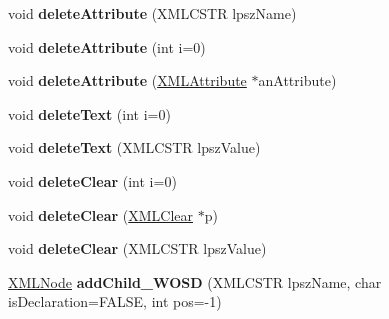 \begin{DoxyCompactItemize}
\item 
void {\bfseries delete\+Attribute} (X\+M\+L\+C\+S\+TR lpsz\+Name)\hypertarget{struct_x_m_l_node_a2b21339e5b370f1d7ebde2dc51217eed}{}\label{struct_x_m_l_node_a2b21339e5b370f1d7ebde2dc51217eed}

\item 
void {\bfseries delete\+Attribute} (int i=0)\hypertarget{struct_x_m_l_node_a61b2405305063594b35b309cc2e22c01}{}\label{struct_x_m_l_node_a61b2405305063594b35b309cc2e22c01}

\item 
void {\bfseries delete\+Attribute} (\hyperlink{struct_x_m_l_attribute}{X\+M\+L\+Attribute} $\ast$an\+Attribute)\hypertarget{struct_x_m_l_node_a6f00d7c1b4eaa29cfdd9d4a709495aca}{}\label{struct_x_m_l_node_a6f00d7c1b4eaa29cfdd9d4a709495aca}

\item 
void {\bfseries delete\+Text} (int i=0)\hypertarget{struct_x_m_l_node_a14a49a23735ea10a44864cb6b4302250}{}\label{struct_x_m_l_node_a14a49a23735ea10a44864cb6b4302250}

\item 
void {\bfseries delete\+Text} (X\+M\+L\+C\+S\+TR lpsz\+Value)\hypertarget{struct_x_m_l_node_a21ee499630d71ab6026753a85f02f582}{}\label{struct_x_m_l_node_a21ee499630d71ab6026753a85f02f582}

\item 
void {\bfseries delete\+Clear} (int i=0)\hypertarget{struct_x_m_l_node_a44b72c82310eb4319dba46eb9cc9f6e9}{}\label{struct_x_m_l_node_a44b72c82310eb4319dba46eb9cc9f6e9}

\item 
void {\bfseries delete\+Clear} (\hyperlink{struct_x_m_l_clear}{X\+M\+L\+Clear} $\ast$p)\hypertarget{struct_x_m_l_node_ae92182823d3d5b40893103ad222ec4a8}{}\label{struct_x_m_l_node_ae92182823d3d5b40893103ad222ec4a8}

\item 
void {\bfseries delete\+Clear} (X\+M\+L\+C\+S\+TR lpsz\+Value)\hypertarget{struct_x_m_l_node_a8fff4baa9a8000f8662ee302438fff64}{}\label{struct_x_m_l_node_a8fff4baa9a8000f8662ee302438fff64}

\item 
\hyperlink{struct_x_m_l_node}{X\+M\+L\+Node} {\bfseries add\+Child\+\_\+\+W\+O\+SD} (X\+M\+L\+C\+S\+TR lpsz\+Name, char is\+Declaration=F\+A\+L\+SE, int pos=-\/1)\hypertarget{struct_x_m_l_node_acb8f9583792c008c80a6c788f3dedf39}{}\label{struct_x_m_l_node_acb8f9583792c008c80a6c788f3dedf39}


\end{DoxyCompactItemize}
